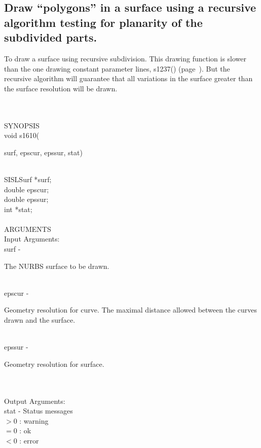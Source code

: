 \subsection{Draw ``polygons'' in a surface using a recursive algorithm testing for 
planarity of the subdivided parts.}
\begin{minipg1}
To draw a surface using recursive subdivision.
This drawing function is slower than the one drawing constant parameter
lines, s1237() (page~\pageref{s1237}). But the recursive algorithm
will guarantee that all variations in the surface greater
than the surface resolution will be drawn.
\end{minipg1} \\ \\
SYNOPSIS\\
	\>void s1610(\begin{minipg3}
		{\fov surf}, {\fov epscur}, {\fov epssur}, {\fov stat})
		\end{minipg3}\\[0.3ex]
		\>\>	SISLSurf	\> 	*{\fov surf};\\
		\>\>	double	\>	{\fov epscur};\\
		\>\>	double	\>	{\fov epssur};\\
		\>\>	int 	\>	*{\fov stat};\\
\\
ARGUMENTS\\
	\>Input Arguments:\\
	\>\>	{\fov surf}\> - \>	\begin{minipg2}
				The NURBS surface to be drawn.
				\end{minipg2}\\
	\>\>	{\fov epscur}\> - \>	\begin{minipg2}
				Geometry resolution for curve.
				The maximal distance allowed between
				the curves 
				drawn and the surface.
				\end{minipg2}\\[0.8ex]
	\>\>	{\fov epssur}\> - \>	\begin{minipg2}
				Geometry resolution for surface.
				\end{minipg2}\\
\\
	\>Output Arguments:\\
	\>\>	{\fov stat}	\> - \>	Status messages\\
		\>\>\>\>\>		$> 0$	: warning\\
		\>\>\>\>\>		$= 0$	: ok\\
		\>\>\>\>\>		$< 0$	: error\\

